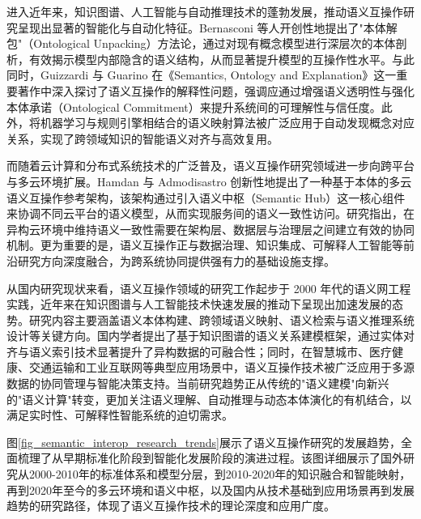 进入近年来，知识图谱、人工智能与自动推理技术的蓬勃发展，推动语义互操作研究呈现出显著的智能化与自动化特征。Bernasconi 等人开创性地提出了"本体解包"（Ontological Unpacking）方法论，通过对现有概念模型进行深层次的本体剖析，有效揭示模型内部隐含的语义结构，从而显著提升模型的互操作性水平\cite{Bernasconi2022Ontological}。与此同时，Guizzardi 与 Guarino 在《Semantics, Ontology and Explanation》这一重要著作中深入探讨了语义互操作的解释性问题，强调应通过增强语义透明性与强化本体承诺（Ontological Commitment）来提升系统间的可理解性与信任度\cite{Guizzardi2023Explanation}。此外，将机器学习与规则引擎相结合的语义映射算法被广泛应用于自动发现概念对应关系，实现了跨领域知识的智能语义对齐与高效复用。

而随着云计算和分布式系统技术的广泛普及，语义互操作研究领域进一步向跨平台与多云环境扩展。Hamdan 与 Admodisastro 创新性地提出了一种基于本体的多云语义互操作参考架构，该架构通过引入语义中枢（Semantic Hub）这一核心组件来协调不同云平台的语义模型，从而实现服务间的语义一致性访问\cite{Hamdan2023Reference,Hamdan2024SemanticMultiCloud}。研究指出，在异构云环境中维持语义一致性需要在架构层、数据层与治理层之间建立有效的协同机制。更为重要的是，语义互操作正与数据治理、知识集成、可解释人工智能等前沿研究方向深度融合，为跨系统协同提供强有力的基础设施支撑。

从国内研究现状来看，语义互操作领域的研究工作起步于 2000 年代的语义网工程实践，近年来在知识图谱与人工智能技术快速发展的推动下呈现出加速发展的态势。研究内容主要涵盖语义本体构建、跨领域语义映射、语义检索与语义推理系统设计等关键方向。国内学者提出了基于知识图谱的语义关系建模框架，通过实体对齐与语义索引技术显著提升了异构数据的可融合性；同时，在智慧城市、医疗健康、交通运输和工业互联网等典型应用场景中，语义互操作技术被广泛应用于多源数据的协同管理与智能决策支持。当前研究趋势正从传统的"语义建模"向新兴的"语义计算"转变，更加关注语义理解、自动推理与动态本体演化的有机结合，以满足实时性、可解释性智能系统的迫切需求。

图\ref{fig_semantic_interop_research_trends}展示了语义互操作研究的发展趋势，全面梳理了从早期标准化阶段到智能化发展阶段的演进过程。该图详细展示了国外研究从2000-2010年的标准体系和模型分层，到2010-2020年的知识融合和智能映射，再到2020年至今的多云环境和语义中枢，以及国内从技术基础到应用场景再到发展趋势的研究路径，体现了语义互操作技术的理论深度和应用广度。

